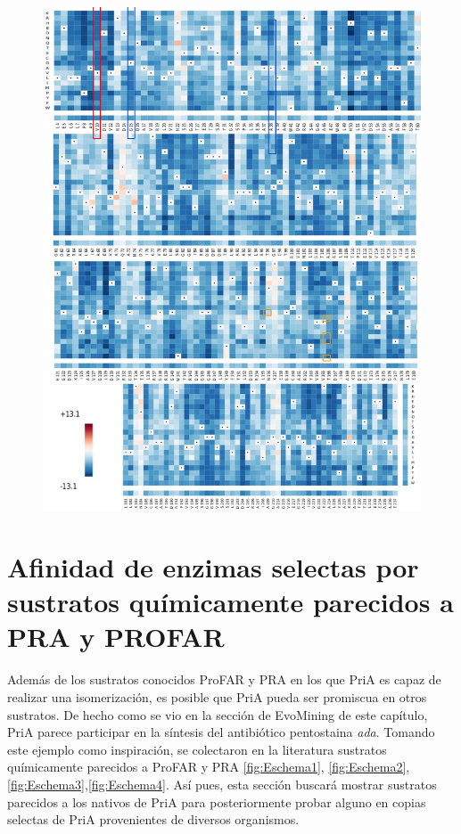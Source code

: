 \documentclass[12pt,twoside]{reedthesis}
\begin{document}
{  \begin{figure}[h!tbp]
  \centering
  \includegraphics[angle = 0,scale = .8]{chapter4/Couplings/PriAMutations.pdf}
  \caption[Tendencia de mutaciones observada en secuencias de PriA]{\footnotesize{}}
  \label{fig:CouplingsMutationsPriA}
  \end{figure}
  
  \section{Afinidad de enzimas selectas por sustratos químicamente
  parecidos a PRA y
  PROFAR}\label{afinidad-de-enzimas-selectas-por-sustratos-quimicamente-parecidos-a-pra-y-profar}
  
  Además de los sustratos conocidos ProFAR y PRA en los que PriA es capaz
  de realizar una isomerización, es posible que PriA pueda ser promiscua
  en otros sustratos. De hecho como se vio en la sección de EvoMining de
  este capítulo, PriA parece participar en la síntesis del antibiótico
  pentostaina \emph{ada}. Tomando este ejemplo como inspiración, se
  colectaron en la literatura sustratos químicamente parecidos a ProFAR y
  PRA \autoref{fig:Eschema1},
  \autoref{fig:Eschema2},\autoref{fig:Eschema3},\autoref{fig:Eschema4}.
  Así pues, esta sección buscará mostrar sustratos parecidos a los nativos
  de PriA para posteriormente probar alguno en copias selectas de PriA
  provenientes de diversos organismos.
  
}
\end{document}
